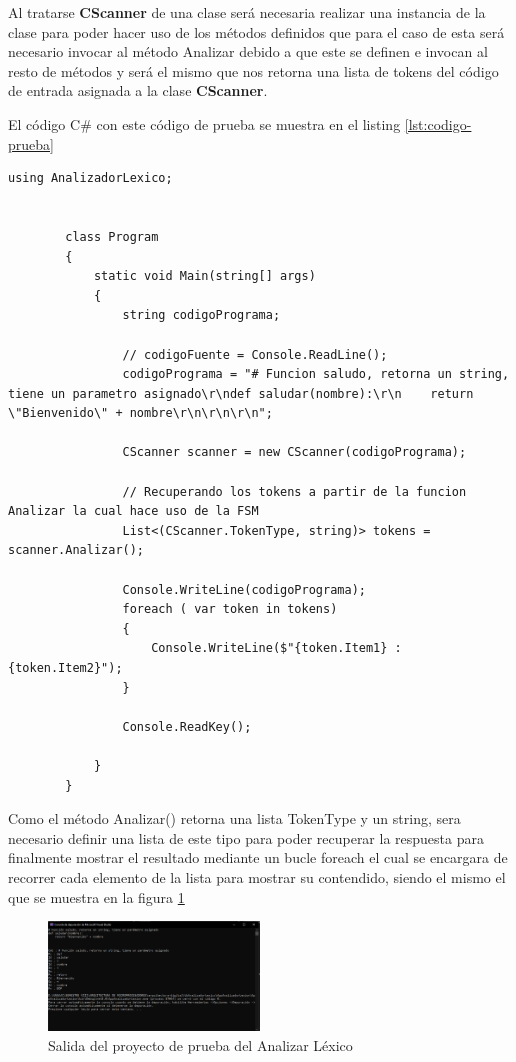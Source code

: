 \documentclass[conference]{IEEEtran}
\begin{document}
	Al tratarse \textbf{CScanner} de una clase será necesaria realizar una instancia de la clase para poder hacer uso de los métodos definidos que para el caso de esta será necesario invocar al método Analizar debido a que este se definen e invocan al resto de métodos y será el mismo que nos retorna una lista de tokens del código de entrada asignada a la clase \textbf{CScanner}.
	
	El código C\# con este código de prueba se muestra en el listing \ref{lst:codigo-prueba}
	
	\begin{lstlisting}[label=lst:codigo-prueba, caption={Codigo C\# de prueba}]
		using AnalizadorLexico;
		
		
		class Program
		{
			static void Main(string[] args)
			{
				string codigoPrograma;
				
				// codigoFuente = Console.ReadLine();
				codigoPrograma = "# Funcion saludo, retorna un string, tiene un parametro asignado\r\ndef saludar(nombre):\r\n    return \"Bienvenido\" + nombre\r\n\r\n\r\n";
				
				CScanner scanner = new CScanner(codigoPrograma);
				
				// Recuperando los tokens a partir de la funcion Analizar la cual hace uso de la FSM
				List<(CScanner.TokenType, string)> tokens = scanner.Analizar();
				
				Console.WriteLine(codigoPrograma);
				foreach ( var token in tokens)
				{
					Console.WriteLine($"{token.Item1} : {token.Item2}");
				}
				
				Console.ReadKey();
				
			}
		}
	\end{lstlisting}
	
	Como el método Analizar() retorna una lista TokenType y un string, sera necesario definir una lista de este tipo para poder recuperar la respuesta para finalmente mostrar el resultado mediante un bucle foreach el cual se encargara de recorrer cada elemento de la lista para mostrar su contendido, siendo el mismo el que se muestra en la figura \ref{fig:salida-analizar-lexico}
	
	\begin{figure}[h]
		\centering
		\includegraphics[width=0.5\textwidth]{media/salida-analizar-lexico}
		\caption{Salida del proyecto de prueba del Analizar Léxico}
		\label{fig:salida-analizar-lexico}
	\end{figure}
	
	
	
	
\end{document}
